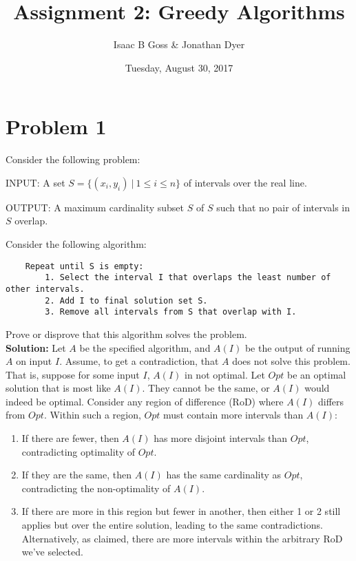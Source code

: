 \documentclass{article}
\author{Isaac B Goss \& Jonathan Dyer}
\title{Assignment 2: Greedy Algorithms}
\date{Tuesday, August 30, 2017}
\providecommand{\soln}{\textbf{Solution: }}
\begin{document}
\maketitle

    \section*{Problem 1}
    Consider the following problem:
    
    INPUT: A set $S = \{(x_i, y_i)\ |\ 1 \leq i \leq n\}$ of intervals over the real line.
    
    OUTPUT: A maximum cardinality subset $S$ of $S$ such that no pair of intervals in $S$ overlap.
        
    Consider the following algorithm:
    
    \begin{lstlisting}
    Repeat until S is empty:
        1. Select the interval I that overlaps the least number of other intervals.
        2. Add I to final solution set S.
        3. Remove all intervals from S that overlap with I.
    \end{lstlisting}

    Prove or disprove that this algorithm solves the problem.\\
    
    \soln Let $A$ be the specified algorithm, and $A(I)$ be the output of running $A$ on input $I$.
    Assume, to get a contradiction, that $A$ does not solve this problem.
    That is, suppose for some input $I$, $A(I)$ in not optimal.
    Let $Opt$ be an optimal solution that is most like $A(I)$.
    They cannot be the same, or $A(I)$ would indeed be optimal.
    Consider any region of difference (RoD) where $A(I)$ differs from $Opt$.
    Within such a region, $Opt$ must contain more intervals than $A(I)$:
    
    \begin{enumerate}
        \item If there are fewer, then $A(I)$ has more disjoint intervals than $Opt$, contradicting optimality of $Opt$.
        \item If they are the same, then $A(I)$ has the same cardinality as $Opt$, contradicting the non-optimality of $A(I)$.
        \item If there are more in this region but fewer in another, then either 1 or 2 still applies but over the entire solution, leading to the same contradictions. Alternatively, as claimed, there are more intervals within the arbitrary RoD we've selected.
    \end{enumerate}
    
\end{document}

